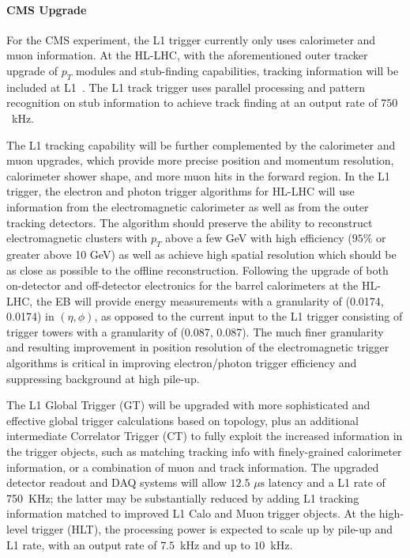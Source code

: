 \paragraph{CMS Upgrade}

For the CMS experiment, the L1 trigger currently only uses calorimeter and muon information. At the HL-LHC, with the aforementioned outer tracker upgrade of $p_T$ modules and stub-finding capabilities, tracking information will be included at L1~\cite{Lourenco:2283192}. The L1 track trigger uses parallel processing and pattern recognition on stub information to achieve track finding at an output rate of $750$~kHz.

The L1 tracking capability will be further complemented by the calorimeter and muon upgrades, which provide more precise position and momentum resolution, calorimeter shower shape, and more muon hits in the forward region. In the L1 trigger, the electron and photon trigger algorithms for HL-LHC will use information from the electromagnetic calorimeter as well as from the outer tracking detectors. The algorithm should preserve the ability to reconstruct electromagnetic clusters with $p_T$ above a few GeV with high efficiency ($95\%$ or greater above 10 GeV) as well as achieve high spatial resolution which should be as close as possible to the offline reconstruction. Following the upgrade of both on-detector and off-detector electronics for the barrel calorimeters at the HL-LHC, the EB %
will provide energy measurements with a granularity of (0.0174, 0.0174)
in $(\eta, \phi)$, as opposed to the current input to the L1 trigger consisting of trigger towers with a granularity of (0.087, 0.087). The much finer granularity and resulting improvement in position resolution of the electromagnetic trigger algorithms is critical in improving electron/photon trigger efficiency and suppressing background at high pile-up.

The L1 Global Trigger (GT) will be upgraded with more sophisticated and effective global trigger calculations based on topology, plus an additional intermediate Correlator Trigger (CT) to fully exploit the increased information in the trigger objects, such as matching tracking info with finely-grained calorimeter information, or a combination of muon and track information. The upgraded detector readout and DAQ systems will allow $12.5\,\, \mu \mathrm{s}$ latency and a L1 rate of 750~KHz; the latter may be substantially reduced by adding L1 tracking information matched to improved L1 Calo and Muon trigger objects. At the high-level trigger (HLT), the processing power is expected to scale up by pile-up and L1 rate, with an output rate of $7.5$~kHz and up to $10$~kHz.

